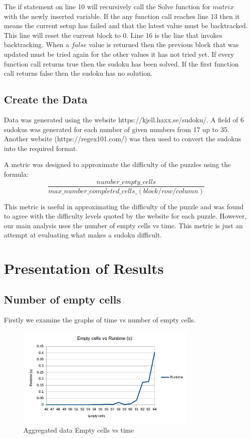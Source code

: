 \documentclass{article}
\begin{document}
The if statement on line 10 will recursively call the Solve function for $matrix$ with the newly inserted variable.
If the any function call reaches line 13 then it means the current setup has failed and that the latest value must be backtracked. This line will reset the current block to 0. Line 16 is the line that invokes backtracking. When a $false$ value is returned then the previous block that was updated must be tried again for the other values it has not tried yet. If every function call returns true then the sudoku has been solved. If the first function call returns false then the sudoku has no solution.

\newpage

\subsection{Create the Data}
Data was generated using the website https://kjell.haxx.se/sudoku/. A field of 6 sudokus was generated for each number of given numbers from 17 up to 35. Another website (https://regex101.com/) was then used to convert the sudokus into the required format.

A metric was designed to approximate the difficulty of the puzzles using the formula: \[\frac{number\_empty\_cells}{max\_number\_completed\_cells\_(block/row/column)}\]

This metric is useful in approximating the difficulty of the puzzle and was found to agree with the difficulty levels quoted by the website for each puzzle. However, our main analysis uses the number of empty cells vs time. This metric is just an attempt at evaluating what makes a sudoku difficult.

\newpage

\section{Presentation of Results}
\subsection{Number of empty cells}
Firstly we examine the graphs of time vs number of empty cells.

\begin{figure}[H]
	\includegraphics[width=0.9\linewidth, height=5cm]{graphs_outputs/EmptycellsVSTimeAggregated.jpg}
	\caption{Aggregated data Empty cells vs time}
\end{figure}
\end{document}
